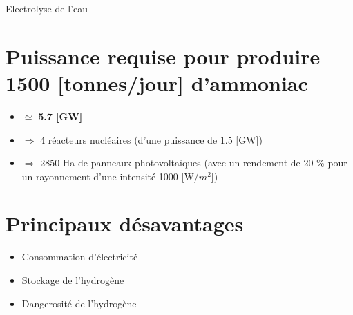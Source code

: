 \documentclass{beamer}
\begin{document}
\begin{frame}{Electrolyse de l'eau}
\part*{Puissance requise pour produire 1500 [tonnes/jour] d'ammoniac}
\begin{itemize}
\item $\simeq$ \textbf{5.7 [GW]}
\item $\Rightarrow$ 4 réacteurs nucléaires (d'une puissance de 1.5 [GW])
\item $\Rightarrow$ 2850 Ha de panneaux photovoltaïques (avec un rendement de 20 \% pour un rayonnement d'une intensité 1000 [W/$m^2$])
\end{itemize}
\part*{Principaux désavantages}
\begin{itemize}
\item Consommation d'électricité
\item Stockage de l'hydrogène
\item Dangerosité de l'hydrogène
\end{itemize}
\end{frame}
\end{document}
